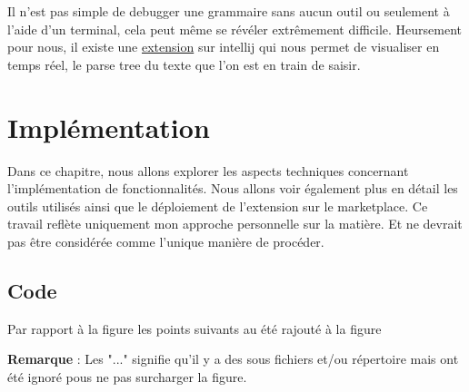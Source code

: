 \documentclass[
    iict, %
    il, %
]{heig-tb}
\begin{document}
Il n'est pas simple de debugger une grammaire sans aucun outil ou seulement à l'aide d'un terminal, cela peut même se révéler extrêmement difficile.
Heursement pour nous, il existe une \href{https://plugins.jetbrains.com/plugin/7358-antlr-v4}{extension} sur intellij qui nous permet de visualiser en temps réel, le parse tree du texte que l'on est en train de saisir.




\chapter{Implémentation}
Dans ce chapitre, nous allons explorer les aspects techniques concernant l'implémentation de fonctionnalités. Nous allons voir également plus en détail les outils utilisés ainsi que le déploiement de l'extension sur le marketplace.
Ce travail reflète uniquement mon approche personnelle sur la matière. Et ne devrait pas être considérée comme l'unique manière de procéder.




\section{Code}

Par rapport à la figure %
les points suivants au été rajouté à la figure %

\textbf{Remarque} : Les "..." signifie qu'il y a des sous fichiers et/ou répertoire mais ont été ignoré pous ne pas surcharger
la figure.
\end{document}
